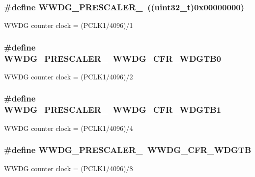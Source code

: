 \subsubsection[{\texorpdfstring{W\+W\+D\+G\+\_\+\+P\+R\+E\+S\+C\+A\+L\+E\+R\+\_\+1}{WWDG_PRESCALER_1}}]{\setlength{\rightskip}{0pt plus 5cm}\#define W\+W\+D\+G\+\_\+\+P\+R\+E\+S\+C\+A\+L\+E\+R\+\_~((uint32\+\_\+t)0x00000000)}\hypertarget{group___w_w_d_g___prescaler_gac611617ca4116f9bfb55c5280abeb281}{}\label{group___w_w_d_g___prescaler_gac611617ca4116f9bfb55c5280abeb281}
W\+W\+DG counter clock = (P\+C\+L\+K1/4096)/1 
\subsubsection[{\texorpdfstring{W\+W\+D\+G\+\_\+\+P\+R\+E\+S\+C\+A\+L\+E\+R\+\_\+2}{WWDG_PRESCALER_2}}]{\setlength{\rightskip}{0pt plus 5cm}\#define W\+W\+D\+G\+\_\+\+P\+R\+E\+S\+C\+A\+L\+E\+R\+\_~{\bf W\+W\+D\+G\+\_\+\+C\+F\+R\+\_\+\+W\+D\+G\+T\+B0}}\hypertarget{group___w_w_d_g___prescaler_ga411e50531af74cfe88b5f58119e546fa}{}\label{group___w_w_d_g___prescaler_ga411e50531af74cfe88b5f58119e546fa}
W\+W\+DG counter clock = (P\+C\+L\+K1/4096)/2 
\subsubsection[{\texorpdfstring{W\+W\+D\+G\+\_\+\+P\+R\+E\+S\+C\+A\+L\+E\+R\+\_\+4}{WWDG_PRESCALER_4}}]{\setlength{\rightskip}{0pt plus 5cm}\#define W\+W\+D\+G\+\_\+\+P\+R\+E\+S\+C\+A\+L\+E\+R\+\_~{\bf W\+W\+D\+G\+\_\+\+C\+F\+R\+\_\+\+W\+D\+G\+T\+B1}}\hypertarget{group___w_w_d_g___prescaler_ga38093104d0ad7e9ef5e036f6d0dc3ca8}{}\label{group___w_w_d_g___prescaler_ga38093104d0ad7e9ef5e036f6d0dc3ca8}
W\+W\+DG counter clock = (P\+C\+L\+K1/4096)/4 
\subsubsection[{\texorpdfstring{W\+W\+D\+G\+\_\+\+P\+R\+E\+S\+C\+A\+L\+E\+R\+\_\+8}{WWDG_PRESCALER_8}}]{\setlength{\rightskip}{0pt plus 5cm}\#define W\+W\+D\+G\+\_\+\+P\+R\+E\+S\+C\+A\+L\+E\+R\+\_~{\bf W\+W\+D\+G\+\_\+\+C\+F\+R\+\_\+\+W\+D\+G\+TB}}\hypertarget{group___w_w_d_g___prescaler_ga766a9eff85955164df09186081f3cb40}{}\label{group___w_w_d_g___prescaler_ga766a9eff85955164df09186081f3cb40}
W\+W\+DG counter clock = (P\+C\+L\+K1/4096)/8 